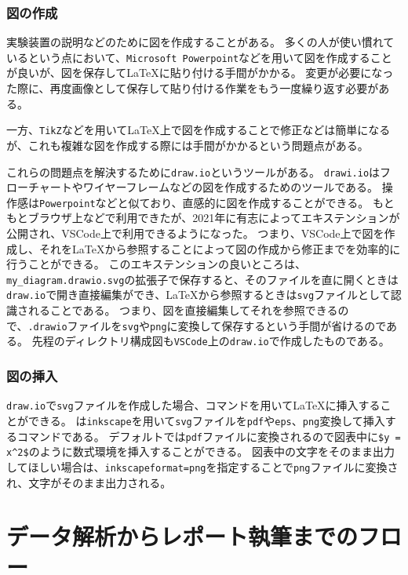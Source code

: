 \subsubsection{図の作成}

実験装置の説明などのために図を作成することがある。
多くの人が使い慣れているという点において、\verb|Microsoft Powerpoint|などを用いて図を作成することが良いが、図を保存して\LaTeX に貼り付ける手間がかかる。
変更が必要になった際に、再度画像として保存して貼り付ける作業をもう一度繰り返す必要がある。

一方、\verb|TikZ|などを用いて\LaTeX 上で図を作成することで修正などは簡単になるが、これも複雑な図を作成する際には手間がかかるという問題点がある。

これらの問題点を解決するために\verb|draw.io|というツールがある。
\verb|drawi.io|はフローチャートやワイヤーフレームなどの図を作成するためのツールである。
操作感は\verb|Powerpoint|などと似ており、直感的に図を作成することができる。
もともとブラウザ上などで利用できたが、2021年に有志によってエキステンションが公開され、VSCode上で利用できるようになった。
つまり、VSCode上で図を作成し、それを\LaTeX から参照することによって図の作成から修正までを効率的に行うことができる。
このエキステンションの良いところは、\verb|my_diagram.drawio.svg|の拡張子で保存すると、そのファイルを直に開くときは\verb|draw.io|で開き直接編集ができ、\LaTeX から参照するときは\verb|svg|ファイルとして認識されることである。
つまり、図を直接編集してそれを参照できるので、\verb|.drawio|ファイルを\verb|svg|や\verb|png|に変換して保存するという手間が省けるのである。
先程のディレクトリ構成図も\verb|VSCode|上の\verb|draw.io|で作成したものである。

\subsubsection{図の挿入}

\verb|draw.io|で\verb|svg|ファイルを作成した場合、\verb||コマンドを用いて\LaTeX に挿入することができる。
\verb||は\verb|inkscape|を用いて\verb|svg|ファイルを\verb|pdf|や\verb|eps|、\verb|png|変換して挿入するコマンドである。
デフォルトでは\verb|pdf|ファイルに変換されるので図表中に\verb|$y = x^2$|のように数式環境を挿入することができる。
図表中の文字をそのまま出力してほしい場合は、\verb|inkscapeformat=png|を指定することで\verb|png|ファイルに変換され、文字がそのまま出力される。

\section{データ解析からレポート執筆までのフロー}

